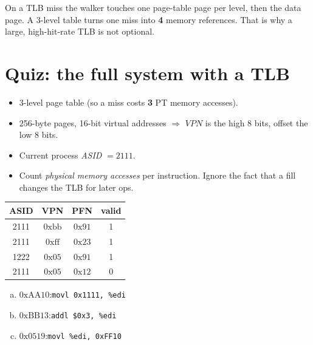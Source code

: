 \documentclass[11pt,a4paper]{article}
\newcommand{\vpn}{\textit{VPN}}
\begin{document}
\begin{warnbox}
On a TLB miss the walker touches one page-table page per level, then
the data page. A 3-level table turns one miss into \textbf{4} memory
references. That is why a large, high-hit-rate TLB is not optional.
\end{warnbox}

\section{Quiz: the full system with a TLB}

\begin{quizbox}[Setup]
\begin{itemize}
  \item 3-level page table (so a miss costs \textbf{3} PT memory accesses).
  \item 256-byte pages, 16-bit virtual addresses
        \(\Rightarrow\) \(\vpn\) is the high 8 bits, offset the low 8 bits.
  \item Current process \textit{ASID} \(=2111\).
  \item Count \emph{physical memory accesses} per instruction.
        Ignore the fact that a fill changes the TLB for later ops.
\end{itemize}

\begin{center}
\renewcommand{\arraystretch}{1.12}
\begin{tabular}{cccc}
  \toprule
  \textbf{ASID} & \textbf{VPN} & \textbf{PFN} & \textbf{valid} \\
  \midrule
  2111 & \(0\text{xbb}\) & \(0\text{x91}\) & 1 \\
  2111 & \(0\text{xff}\) & \(0\text{x23}\) & 1 \\
  1222 & \(0\text{x05}\) & \(0\text{x91}\) & 1 \\
  2111 & \(0\text{x05}\) & \(0\text{x12}\) & 0 \\
  \bottomrule
\end{tabular}
\end{center}

\begin{enumerate}[(a)]
  \item \(0\text{xAA10}\):\quad \texttt{movl 0x1111, \%edi}
  \item \(0\text{xBB13}\):\quad \texttt{addl \$0x3, \%edi}
  \item \(0\text{x0519}\):\quad \texttt{movl \%edi, 0xFF10}
\end{enumerate}
\end{quizbox}
\end{document}
